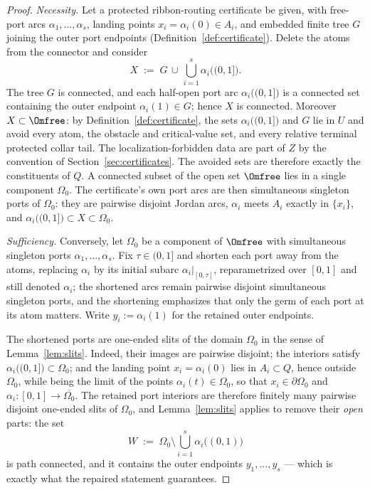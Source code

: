 \begin{proof}
\emph{Necessity.}
Let a protected ribbon-routing certificate be given, with free-port arcs
$\alpha_1,\dots,\alpha_s$, landing points $x_i=\alpha_i(0)\in A_i$, and embedded finite
tree $G$ joining the outer port endpoints (Definition~\ref{def:certificate}). Delete the
atoms from the connector and consider
\[
X\;:=\;G\,\cup\,\bigcup_{i=1}^{s}\alpha_i\bigl((0,1]\bigr).
\]
The tree $G$ is connected, and each half-open port arc $\alpha_i\bigl((0,1]\bigr)$ is a
connected set containing the outer endpoint $\alpha_i(1)\in G$; hence $X$ is connected.
Moreover $X\subset\Omfree$: by Definition~\ref{def:certificate}, the sets
$\alpha_i\bigl((0,1]\bigr)$ and $G$ lie in $U$ and avoid every atom, the obstacle and
critical-value set, and every relative terminal protected collar tail.  The
localization-forbidden data are part of $Z$ by the convention of
Section~\ref{sec:certificates}.  The avoided sets are therefore exactly the
constituents of $Q$. A
connected subset of the open set $\Omfree$ lies in a single component $\Omega_0$. The
certificate's own port arcs are then simultaneous singleton ports of $\Omega_0$: they
are pairwise disjoint Jordan arcs, $\alpha_i$ meets $A_i$ exactly in $\{x_i\}$, and
$\alpha_i\bigl((0,1]\bigr)\subset X\subset\Omega_0$.

\emph{Sufficiency.}
Conversely, let $\Omega_0$ be a component of $\Omfree$ with simultaneous singleton ports
$\alpha_1,\dots,\alpha_s$. Fix $\tau\in(0,1]$ and shorten each port away from the atoms,
replacing $\alpha_i$ by its initial subarc $\alpha_i|_{[0,\tau]}$, reparametrized over
$[0,1]$ and still denoted $\alpha_i$; the shortened arcs remain pairwise disjoint
simultaneous singleton ports, and the shortening emphasizes that only the germ of each
port at its atom matters. Write $y_i:=\alpha_i(1)$ for the retained outer endpoints.

The shortened ports are one-ended slits of the domain $\Omega_0$ in the sense of
Lemma~\ref{lem:slits}. Indeed, their images are pairwise disjoint; the interiors satisfy
$\alpha_i\bigl((0,1]\bigr)\subset\Omega_0$; and the landing point
$x_i=\alpha_i(0)$ lies in $A_i\subset Q$, hence outside $\Omega_0$, while being the
limit of the points $\alpha_i(t)\in\Omega_0$, so that $x_i\in\partial\Omega_0$ and
$\alpha_i\colon[0,1]\to\overline{\Omega_0}$. The retained port interiors are therefore
finitely many pairwise disjoint one-ended slits of $\Omega_0$, and
Lemma~\ref{lem:slits} applies to remove their \emph{open} parts: the set
\[
W\;:=\;\Omega_0\setminus\bigcup_{i=1}^{s}\alpha_i\bigl((0,1)\bigr)
\]
is path connected, and it contains the outer endpoints $y_1,\dots,y_s$ --- which is
exactly what the repaired statement guarantees.


\end{proof}
